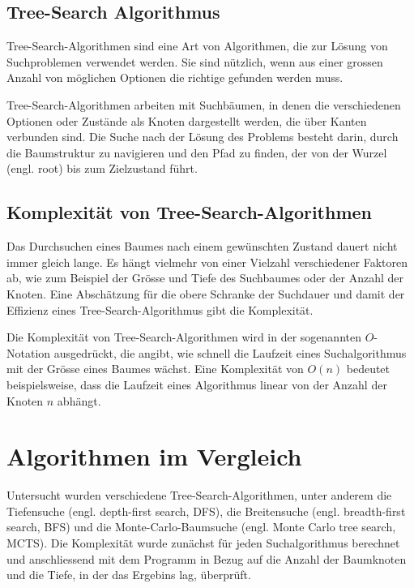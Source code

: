 \documentclass[a4paper,11pt]{article}
\begin{document}
\subsection{Tree-Search Algorithmus}
Tree-Search-Algorithmen sind eine Art von Algorithmen, die zur Lösung von Suchproblemen verwendet werden. Sie sind nützlich, wenn aus einer grossen Anzahl von möglichen Optionen die richtige gefunden werden muss.

Tree-Search-Algorithmen arbeiten mit Suchbäumen, in denen die verschiedenen Optionen oder Zustände als Knoten dargestellt werden, die über Kanten verbunden sind. Die Suche nach der Lösung des Problems besteht darin, durch die Baumstruktur zu navigieren und den Pfad zu finden, der von der Wurzel (engl. root) bis zum Zielzustand führt.

\subsection{Komplexität von Tree-Search-Algorithmen}
Das Durchsuchen eines Baumes nach einem gewünschten Zustand dauert nicht immer gleich lange. Es hängt vielmehr von einer Vielzahl verschiedener Faktoren ab, wie zum Beispiel der Grösse und Tiefe des Suchbaumes oder der Anzahl der Knoten. Eine Abschätzung für die obere Schranke der Suchdauer und damit der Effizienz eines Tree-Search-Algorithmus gibt die Komplexität. 

Die Komplexität von Tree-Search-Algorithmen wird in der sogenannten $O$-Notation ausgedrückt, die angibt, wie schnell die Laufzeit eines Suchalgorithmus mit der Grösse eines Baumes wächst. Eine Komplexität von $O(n)$ bedeutet beispielsweise, dass die Laufzeit eines Algorithmus linear von der Anzahl der Knoten $n$ abhängt.

\section{Algorithmen im Vergleich}
Untersucht wurden verschiedene Tree-Search-Algorithmen, unter anderem die Tiefensuche (engl. depth-first search, DFS), die Breitensuche (engl. breadth-first search, BFS) und die Monte-Carlo-Baumsuche (engl. Monte Carlo tree search, MCTS). Die Komplexität wurde zunächst für jeden Suchalgorithmus berechnet und anschliessend mit dem Programm in Bezug auf die Anzahl der Baumknoten und die Tiefe, in der das Ergebins lag, überprüft.
\end{document}
